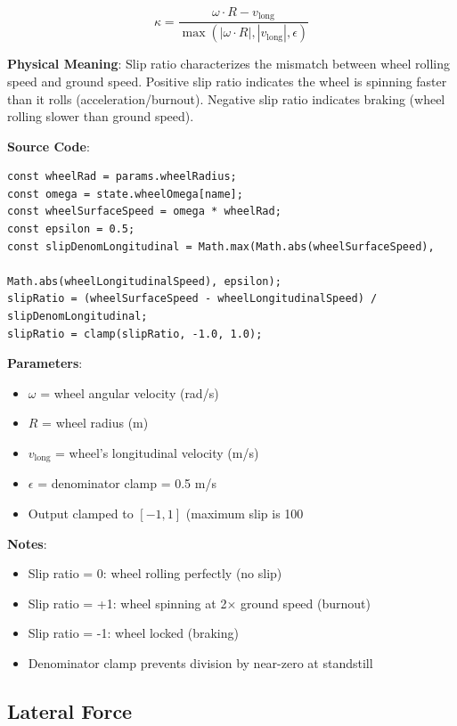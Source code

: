 \begin{equation}
  \kappa = \frac{\omega \cdot R - v_{\text{long}}}{\max(|\omega \cdot R|, |v_{\text{long}}|, \epsilon)}
  \label{eq:slip-ratio}
\end{equation}

\textbf{Physical Meaning}: Slip ratio characterizes the mismatch between wheel rolling speed and ground speed. Positive slip ratio indicates the wheel is spinning faster than it rolls (acceleration/burnout). Negative slip ratio indicates braking (wheel rolling slower than ground speed).

\textbf{Source Code}: 

\begin{lstlisting}[caption={Slip ratio computation}]
const wheelRad = params.wheelRadius;
const omega = state.wheelOmega[name];
const wheelSurfaceSpeed = omega * wheelRad;
const epsilon = 0.5;
const slipDenomLongitudinal = Math.max(Math.abs(wheelSurfaceSpeed),
                                       Math.abs(wheelLongitudinalSpeed), epsilon);
slipRatio = (wheelSurfaceSpeed - wheelLongitudinalSpeed) / slipDenomLongitudinal;
slipRatio = clamp(slipRatio, -1.0, 1.0);
\end{lstlisting}

\textbf{Parameters}:
\begin{itemize}
  \item $\omega$ = wheel angular velocity (rad/s)
  \item $R$ = wheel radius (m)
  \item $v_{\text{long}}$ = wheel's longitudinal velocity (m/s)
  \item $\epsilon$ = denominator clamp = 0.5 m/s
  \item Output clamped to $[-1, 1]$ (maximum slip is 100%
\end{itemize}

\textbf{Notes}:
\begin{itemize}
  \item Slip ratio = 0: wheel rolling perfectly (no slip)
  \item Slip ratio = +1: wheel spinning at 2× ground speed (burnout)
  \item Slip ratio = -1: wheel locked (braking)
  \item Denominator clamp prevents division by near-zero at standstill
\end{itemize}

\subsection{Lateral Force}


